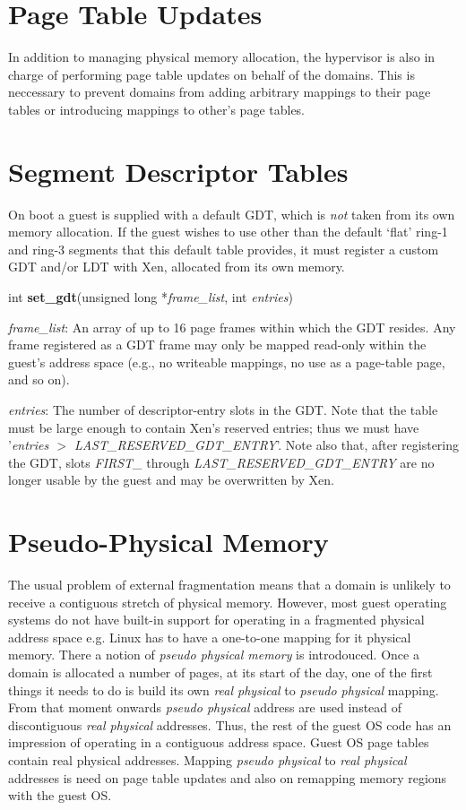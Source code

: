 \documentclass[11pt,twoside,final,openright]{xenstyle}
\begin{document}
\section{Page Table Updates}
In addition to managing physical memory allocation, the hypervisor is also in
charge of performing page table updates on behalf of the domains. This is 
neccessary to prevent domains from adding arbitrary mappings to their page
tables or introducing mappings to other's page tables.

\section{Segment Descriptor Tables}

On boot a guest is supplied with a default GDT, which is {\em not}
taken from its own memory allocation. If the guest wishes to use other
than the default `flat' ring-1 and ring-3 segments that this default
table provides, it must register a custom GDT and/or LDT with Xen,
allocated from its own memory.

int {\bf set\_gdt}(unsigned long *{\em frame\_list}, int {\em entries})

{\em frame\_list}: An array of up to 16 page frames within which the GDT
resides. Any frame registered as a GDT frame may only be mapped
read-only within the guest's address space (e.g., no writeable
mappings, no use as a page-table page, and so on).

{\em entries}: The number of descriptor-entry slots in the GDT. Note that
the table must be large enough to contain Xen's reserved entries; thus
we must have '{\em entries $>$ LAST\_RESERVED\_GDT\_ENTRY}'. Note also that,
after registering the GDT, slots {\em FIRST\_} through
{\em LAST\_RESERVED\_GDT\_ENTRY} are no longer usable by the guest and may be
overwritten by Xen.

\section{Pseudo-Physical Memory}
The usual problem of external fragmentation means that a domain is unlikely to
receive a contiguous stretch of physical memory. However, most guest operating
systems do not have built-in support for operating in a fragmented physical
address space e.g. Linux has to have a one-to-one mapping for it physical
memory. There a notion of {\it pseudo physical memory} is introdouced. 
Once a domain is allocated a number of pages, at its start of the day, one of
the first things it needs to do is build its own {\it real physical} to 
{\it pseudo physical} mapping. From that moment onwards {\it pseudo physical}
address are used instead of discontiguous {\it real physical} addresses. Thus,
the rest of the guest OS code has an impression of operating in a contiguous
address space. Guest OS page tables contain real physical addresses. Mapping
{\it pseudo physical} to {\it real physical} addresses is need on page
table updates and also on remapping memory regions with the guest OS.
\end{document}
